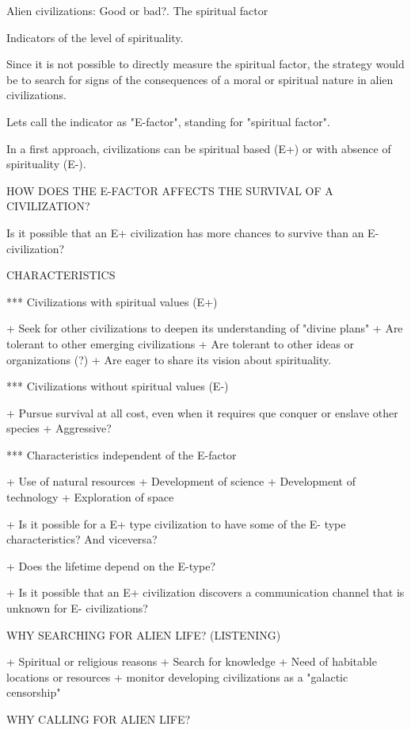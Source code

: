 Alien civilizations: Good or bad?.  The spiritual factor


Indicators of the level of spirituality.



Since it is not possible to directly measure the spiritual factor, the
strategy would be to search for signs of the consequences of a moral or
spiritual nature in alien civilizations.


Lets call the indicator as "E-factor", standing for "spiritual factor".

In a first approach, civilizations can be spiritual based (E+) or with absence of spirituality (E-).



HOW DOES THE E-FACTOR AFFECTS THE SURVIVAL OF A CIVILIZATION?


Is it possible that an E+ civilization has more chances to survive
than an E- civilization?



CHARACTERISTICS


*** Civilizations with spiritual values (E+)

+ Seek for other civilizations to deepen its understanding of "divine plans"
+ Are tolerant to other emerging civilizations
+ Are tolerant to other ideas or organizations (?)
+ Are eager to share its vision about spirituality.

*** Civilizations without spiritual values (E-)

+ Pursue survival at all cost, even when it requires que conquer or enslave other species
+ Aggressive?


*** Characteristics independent of the E-factor

+ Use of natural resources
+ Development of science
+ Development of technology
+ Exploration of space

+ Is it possible for a E+ type civilization to have some of the E- type characteristics?   And viceversa?

+ Does the lifetime depend on the E-type?

+ Is it possible that an E+ civilization discovers a communication channel
that is unknown for E- civilizations?

WHY SEARCHING FOR ALIEN LIFE? (LISTENING)

+ Spiritual or religious reasons
+ Search for knowledge
+ Need of habitable locations or resources
+ monitor developing civilizations as a "galactic censorship"

WHY CALLING FOR ALIEN LIFE?

